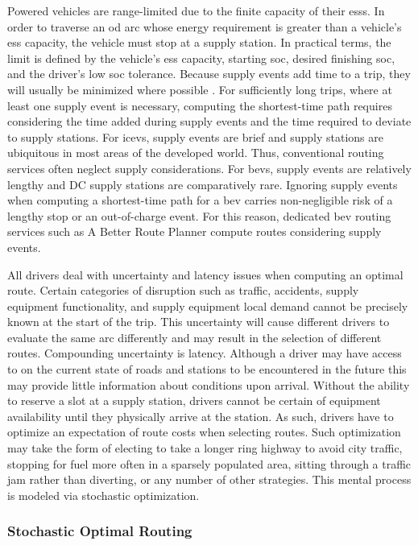 Powered vehicles are range-limited due to the finite capacity of their \glspl{ess}. In order to traverse an \gls{od} arc whose energy requirement is greater than a vehicle's \gls{ess} capacity, the vehicle must stop at a supply station. In practical terms, the limit is defined by the vehicle's \gls{ess} capacity, starting \gls{soc}, desired finishing \gls{soc}, and the driver's low \gls{soc} tolerance. Because supply events add time to a trip, they will usually be minimized where possible \cite{Ge_2022}. For sufficiently long trips, where at least one supply event is necessary, computing the shortest-time path requires considering the time added during supply events and the time required to deviate to supply stations. For \glspl{icev}, supply events are brief and supply stations are ubiquitous in most areas of the developed world. Thus, conventional routing services often neglect supply considerations. For \glspl{bev}, supply events are relatively lengthy and DC supply stations are comparatively rare. Ignoring supply events when computing a shortest-time path for a \gls{bev} carries non-negligible risk of a lengthy stop or an out-of-charge event. For this reason, dedicated \gls{bev} routing services such as A Better Route Planner compute routes considering supply events.

All drivers deal with uncertainty and latency issues when computing an optimal route. Certain categories of disruption such as traffic, accidents, supply equipment functionality, and supply equipment local demand cannot be precisely known at the start of the trip. This uncertainty will cause different drivers to evaluate the same arc differently and may result in the selection of different routes. Compounding uncertainty is latency. Although a driver may have access to on the current state of roads and stations to be encountered in the future this may provide little information about conditions upon arrival. Without the ability to reserve a slot at a supply station, drivers cannot be certain of equipment availability until they physically arrive at the station. As such, drivers have to optimize an expectation of route costs when selecting routes. Such optimization may take the form of electing to take a longer ring highway to avoid city traffic, stopping for fuel more often in a sparsely populated area, sitting through a traffic jam rather than diverting, or any number of other strategies. This mental process is modeled via stochastic optimization.

\subsubsection*{Stochastic Optimal Routing}

